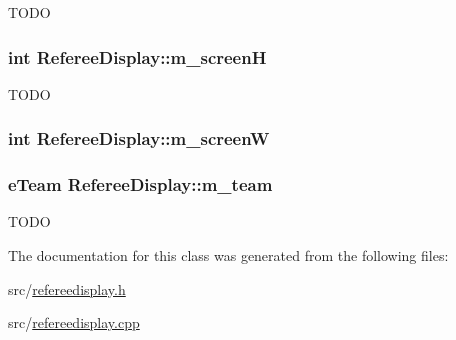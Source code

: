 \label{classRefereeDisplay_a4a777a38327f96fe1e5c9051b6c3c38f}
TODO \hypertarget{classRefereeDisplay_a136af0a18d0eadffbcaa755fdf76e328}{
\subsubsection[{m\_\-screenH}]{\setlength{\rightskip}{0pt plus 5cm}int {\bf RefereeDisplay::m\_\-screenH}}}
\label{classRefereeDisplay_a136af0a18d0eadffbcaa755fdf76e328}
TODO \hypertarget{classRefereeDisplay_aed7aa88d65bc9b4f79fe8dd2598a92e5}{
\subsubsection[{m\_\-screenW}]{\setlength{\rightskip}{0pt plus 5cm}int {\bf RefereeDisplay::m\_\-screenW}}}
\label{classRefereeDisplay_aed7aa88d65bc9b4f79fe8dd2598a92e5}
\hypertarget{classRefereeDisplay_a02ec6cdc79904b4727553f6802c36d9e}{
\subsubsection[{m\_\-team}]{\setlength{\rightskip}{0pt plus 5cm}eTeam {\bf RefereeDisplay::m\_\-team}}}
\label{classRefereeDisplay_a02ec6cdc79904b4727553f6802c36d9e}
TODO 

The documentation for this class was generated from the following files:\begin{DoxyCompactItemize}
\item 
src/\hyperlink{refereedisplay_8h}{refereedisplay.h}\item 
src/\hyperlink{refereedisplay_8cpp}{refereedisplay.cpp}\end{DoxyCompactItemize}
